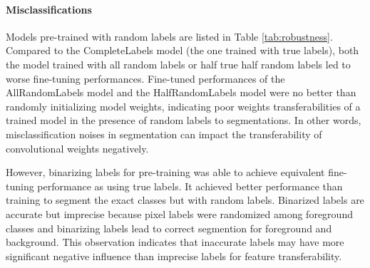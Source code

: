 \paragraph{Misclassifications}
Models pre-trained with random labels are listed in Table \ref{tab:robustness}.
Compared to the CompleteLabels model (the one trained with true labels), both the model trained with all random labels or half true half random labels led to worse fine-tuning performances.
Fine-tuned performances of the AllRandomLabels model and the HalfRandomLabels model were no better than randomly initializing model weights, indicating poor weights transferabilities of a trained model in the presence of random labels to segmentations.
In other words, misclassification noises in segmentation can impact the transferability of convolutional weights negatively.

However, binarizing labels for pre-training was able to achieve equivalent fine-tuning performance as using true labels.
It achieved better performance than training to segment the exact classes but with random labels.
Binarized labels are accurate but imprecise because pixel labels were randomized among foreground classes and binarizing labels lead to correct segmention for foreground and background.
This observation indicates that inaccurate labels may have more significant negative influence than imprecise labels for feature transferability.


